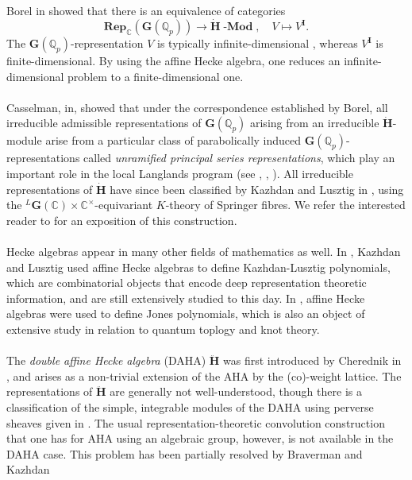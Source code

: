\documentclass[a4paper]{report}
\theoremstyle{theorem}
\theoremstyle{definition}
\theoremstyle{remark}
\theoremstyle{proposition}
\theoremstyle{conjecture}
\theoremstyle{lemma}
\theoremstyle{corollary}
\theoremstyle{exercise}
\theoremstyle{example}
\newcommand{\C}{\mathbb{C}}
\newcommand{\on}{\operatorname}
\newcommand{\lmod}{\on{\mathbf{-Mod}}}
\begin{document}
  Borel in \cite{bor76} showed that there is an equivalence of categories
  $$\mathbf{Rep}_\C(\mathbf{G}(\mathbb{Q}_p)) \longrightarrow \mathbf{\dot{H}}\lmod,\quad V\longmapsto V^{\mathbf{I}}.$$
  The $\mathbf{G}(\mathbb{Q}_p)$-representation $V$ is typically infinite-dimensional \cite{bum10}, 
  whereas $V^{\mathbf{I}}$ is finite-dimensional. By using the affine Hecke algebra, one reduces an 
  infinite-dimensional problem to a finite-dimensional one.\\\\
  Casselman, in\cite{cas80}, showed that under the correspondence established by 
  Borel, all irreducible admissible representations of $\mathbf{G}(\mathbb{Q}_p)$ arising from an
  irreducible $\mathbf{\dot{H}}$-module arise from a particular class of 
  parabolically induced $\mathbf{G}(\mathbb{Q}_p)$-representations called 
  \emph{unramified principal series representations}, which play an important
  role in the local Langlands program (see \cite{gh24}, \cite{bh06}, \cite{rw21}). All irreducible representations of 
  $\mathbf{\dot{H}}$ have since been classified by Kazhdan and Lusztig in \cite{kl87}, using the ${}^L\mathbf{G}(\C)\times \C^\times$-equivariant 
  $K$-theory of Springer fibres. We refer the interested reader to \cite{cg09} for an 
  exposition of this construction. \\\\
  Hecke algebras appear in many other fields of mathematics as well.
  In \cite{kl87}, Kazhdan and Lusztig used affine Hecke algebras to define 
  Kazhdan-Lusztig polynomials, which are combinatorial objects that encode
  deep representation theoretic information, and are still extensively studied
  to this day. In \cite{jon87}, affine Hecke algebras were used to define Jones
  polynomials, which is also an object of extensive study in relation to quantum
  toplogy and knot theory. \\\\
  The \emph{double affine Hecke algebra} (DAHA) $\mathbf{\ddot{\mathbf{H}}}$ was first
  introduced by Cherednik in \cite{che90}, and arises as a non-trivial extension
  of the AHA by the (co)-weight lattice.
  The representations of $\mathbf{\ddot{\mathbf{H}}}$ are generally not well-understood, though 
  there is a classification of the simple, integrable modules of the DAHA using perverse
  sheaves given in \cite{vas05}. The usual representation-theoretic convolution construction that one has 
  for AHA using an algebraic group, however, is not available in the DAHA case.
  This problem has been partially resolved by Braverman and Kazhdan 
\end{document}
